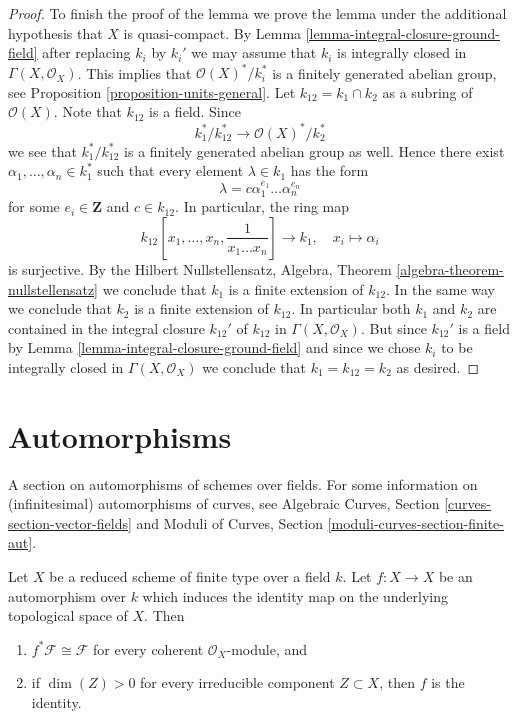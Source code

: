 \begin{proof}
\medskip\noindent
To finish the proof of the lemma we prove the lemma under the
additional hypothesis that $X$ is quasi-compact. By
Lemma \ref{lemma-integral-closure-ground-field}
after replacing $k_i$ by $k_i'$
we may assume that $k_i$ is integrally closed in $\Gamma(X, \mathcal{O}_X)$.
This implies that $\mathcal{O}(X)^*/k_i^*$ is a finitely generated
abelian group, see
Proposition \ref{proposition-units-general}.
Let $k_{12} = k_1 \cap k_2$ as a subring of $\mathcal{O}(X)$.
Note that $k_{12}$ is a field. Since
$$
k_1^*/k_{12}^* \longrightarrow \mathcal{O}(X)^*/k_2^*
$$
we see that $k_1^*/k_{12}^*$ is a finitely generated abelian group as well.
Hence there exist $\alpha_1, \ldots, \alpha_n \in k_1^*$ such that
every element $\lambda \in k_1$ has the form
$$
\lambda = c \alpha_1^{e_1} \ldots \alpha_n^{e_n}
$$
for some $e_i \in \mathbf{Z}$ and $c \in k_{12}$.
In particular, the ring map
$$
k_{12}[x_1, \ldots, x_n, \frac{1}{x_1 \ldots x_n}] \longrightarrow k_1, \quad
x_i \longmapsto \alpha_i
$$
is surjective. By the Hilbert Nullstellensatz,
Algebra, Theorem \ref{algebra-theorem-nullstellensatz}
we conclude that $k_1$ is a finite extension of $k_{12}$.
In the same way we conclude that $k_2$ is a finite extension of $k_{12}$.
In particular both $k_1$ and $k_2$ are contained in the integral closure
$k_{12}'$ of $k_{12}$ in $\Gamma(X, \mathcal{O}_X)$. But since $k_{12}'$
is a field by
Lemma \ref{lemma-integral-closure-ground-field}
and since we chose $k_i$ to be integrally closed in $\Gamma(X, \mathcal{O}_X)$
we conclude that $k_1 = k_{12} = k_2$ as desired.
\end{proof}





\section{Automorphisms}
\label{section-automorphisms}

\noindent
A section on automorphisms of schemes over fields. For some information
on (infinitesimal) automorphisms of curves, see
Algebraic Curves, Section \ref{curves-section-vector-fields}
and
Moduli of Curves, Section \ref{moduli-curves-section-finite-aut}.

\begin{lemma}
\label{lemma-automorphism}
Let $X$ be a reduced scheme of finite type over a field $k$. Let $f : X \to X$
be an automorphism over $k$ which induces the identity map on the underlying
topological space of $X$. Then
\begin{enumerate}
\item $f^*\mathcal{F} \cong \mathcal{F}$ for every coherent
$\mathcal{O}_X$-module, and
\item if $\dim(Z) > 0$ for every irreducible component $Z \subset X$,
then $f$ is the identity.
\end{enumerate}
\end{lemma}

